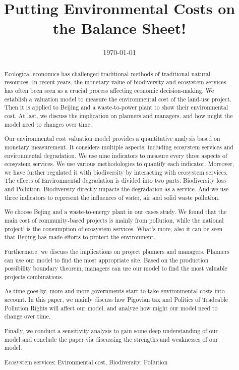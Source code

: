 \documentclass{mcmthesis}
\title{Putting Environmental Costs on the Balance Sheet!}
\author{}
\date{\today}
\begin{document}
	\begin{abstract}
		
		Ecological economics has challenged traditional methods of traditional natural resources. In recent years, the monetary value of biodiversity and ecosystem services has often been seen as a crucial process affecting economic decision-making. We establish a valuation model to measure the environmental cost of the land-use project. Then it is applied to Beijing and a waste-to-power plant to show their environmental cost. At last, we discuss the implication on planners and managers, and how might the model need to changes over time.
		
		Our environmental cost valuation model provides a quantitative analysis based on monetary measurement. It considers multiple aspects, including ecosystem services and environmental degradation. We use nine indicators to measure every three aspects of ecosystem services. We use various methodologies to quantify each indicator. Moreover, we have further regulated it with biodiversity by interacting with ecosystem services. The effects of Environmental degradation is divided into two parts: Biodiversity loss and Pollution. Biodiversity directly impacts the degradation as a service. And we use three indicators to represent the influences of water, air and solid waste pollution.
		
		We choose Bejing and a waste-to-energy plant in our cases study. We found that the main cost of community-based projects is mainly from pollution, while the national project' is the consumption of ecosystem services. What's more, also it can be seen that Beijing has made efforts to protect the environment.
		
		Furthermore, we discuss the implications on project planners and managers. Planners can use our model to find the most appropriate site. Based on the production possibility boundary theorem, managers can use our model to find the most valuable projects combinations.
		
		As time goes by, more and more governments start to take environmental costs into account. In this paper, we mainly discuss how Pigovian tax and Politics of Tradeable Pollution Rights will affect our model, and analyze how might our model need to change over time.
		
		Finally, we conduct a sensitivity analysis to gain some deep understanding of our model and conclude the paper via discussing the strengths and weaknesses of our model.
		
		
		\begin{keywords}
			Ecosystem services; Evironmental cost, Biodiversity, Pollution
		\end{keywords}
	\end{abstract}
\end{document}
